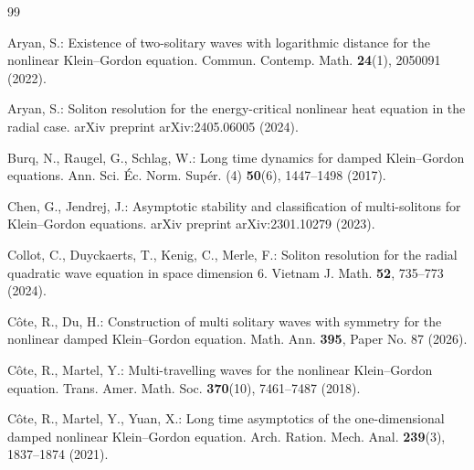 \documentclass[reqno]{amsart}
\theoremstyle{plain}
\theoremstyle{definition}
\numberwithin{equation}{section}
\begin{document}
\begin{thebibliography}{99}
%
%

 Aryan, S.:
Existence of two-solitary waves with logarithmic distance for the nonlinear Klein--Gordon equation.
Commun. Contemp. Math. \textbf{24}(1), 2050091 (2022).

 Aryan, S.:
Soliton resolution for the energy-critical nonlinear heat equation in the radial case.
arXiv preprint arXiv:2405.06005 (2024).


 Burq, N., Raugel, G., Schlag, W.:
Long time dynamics for damped Klein--Gordon equations.
Ann. Sci. \'Ec. Norm. Sup\'er. (4) \textbf{50}(6), 1447--1498 (2017).

%
%

 Chen, G., Jendrej, J.:
Asymptotic stability and classification of multi-solitons for Klein--Gordon equations.
arXiv preprint arXiv:2301.10279 (2023).

 Collot, C., Duyckaerts, T., Kenig, C., Merle, F.:
Soliton resolution for the radial quadratic wave equation in space dimension 6.
Vietnam J. Math. \textbf{52}, 735--773 (2024).

 C\^ote, R., Du, H.:
Construction of multi solitary waves with symmetry for the nonlinear
damped Klein--Gordon equation.
Math. Ann. \textbf{395}, Paper No. 87 (2026).

 C\^ote, R., Martel, Y.:
Multi-travelling waves for the nonlinear Klein--Gordon equation.
Trans. Amer. Math. Soc. \textbf{370}(10), 7461--7487 (2018).

 C\^ote, R., Martel, Y., Yuan, X.:
Long time asymptotics of the one-dimensional damped nonlinear Klein--Gordon equation.
Arch. Ration. Mech. Anal. \textbf{239}(3), 1837--1874 (2021).


\end{thebibliography}
\end{document}
